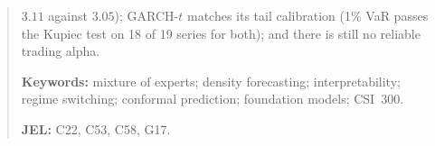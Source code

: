 \begin{abstract}
$3.11$ against $3.05$); GARCH-$t$ matches its tail calibration (1\% VaR passes the Kupiec test on 18
of 19 series for both); and there is still no reliable trading alpha.

\medskip\noindent\textbf{Keywords:} mixture of experts; density forecasting; interpretability;
regime switching; conformal prediction; foundation models; CSI~300.

\noindent\textbf{JEL:} C22, C53, C58, G17.
\end{abstract}
